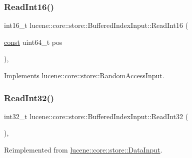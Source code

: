 \subsubsection{\texorpdfstring{Read\+Int16()}{ReadInt16()}\hspace{0.1cm}{\footnotesize\ttfamily [2/2]}}
{\footnotesize\ttfamily int16\+\_\+t lucene\+::core\+::store\+::\+Buffered\+Index\+Input\+::\+Read\+Int16 (\begin{DoxyParamCaption}\item[{\mbox{\hyperlink{ZlibCrc32_8h_a2c212835823e3c54a8ab6d95c652660e}{const}} uint64\+\_\+t}]{pos }\end{DoxyParamCaption})\hspace{0.3cm}{\ttfamily [inline]}, {\ttfamily [virtual]}}



Implements \mbox{\hyperlink{classlucene_1_1core_1_1store_1_1RandomAccessInput_ae2310d2e4250a14c33c3e24d18a13b68}{lucene\+::core\+::store\+::\+Random\+Access\+Input}}.

\mbox{\label{classlucene_1_1core_1_1store_1_1BufferedIndexInput_a9e4dfe35550c492c8cbcb412a39f08e7}} 
\subsubsection{\texorpdfstring{Read\+Int32()}{ReadInt32()}\hspace{0.1cm}{\footnotesize\ttfamily [1/2]}}
{\footnotesize\ttfamily int32\+\_\+t lucene\+::core\+::store\+::\+Buffered\+Index\+Input\+::\+Read\+Int32 (\begin{DoxyParamCaption}{ }\end{DoxyParamCaption})\hspace{0.3cm}{\ttfamily [inline]}, {\ttfamily [virtual]}}



Reimplemented from \mbox{\hyperlink{classlucene_1_1core_1_1store_1_1DataInput_a1be184e66e0bf1f9f948e758429d1ed5}{lucene\+::core\+::store\+::\+Data\+Input}}.

\mbox{\label{classlucene_1_1core_1_1store_1_1BufferedIndexInput_a4c42570e52badebd5d2bd847611c6a31}} 
